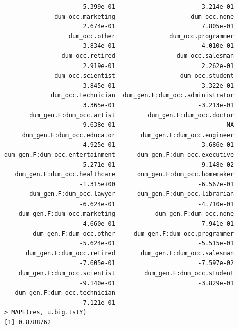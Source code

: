 \documentclass[11pt]{article}
\begin{document}
\begin{verbatim}
                      5.399e-01                        3.214e-01  
              dum_occ.marketing                     dum_occ.none  
                      2.674e-01                        7.805e-01  
                  dum_occ.other               dum_occ.programmer  
                      3.834e-01                        4.010e-01  
                dum_occ.retired                 dum_occ.salesman  
                      2.919e-01                        2.262e-01  
              dum_occ.scientist                  dum_occ.student  
                      3.845e-01                        3.322e-01  
             dum_occ.technician  dum_gen.F:dum_occ.administrator  
                      3.365e-01                       -3.213e-01  
       dum_gen.F:dum_occ.artist         dum_gen.F:dum_occ.doctor  
                     -9.638e-01                               NA  
     dum_gen.F:dum_occ.educator       dum_gen.F:dum_occ.engineer  
                     -4.925e-01                       -3.686e-01  
dum_gen.F:dum_occ.entertainment      dum_gen.F:dum_occ.executive  
                     -5.271e-01                       -9.148e-02  
   dum_gen.F:dum_occ.healthcare      dum_gen.F:dum_occ.homemaker  
                     -1.315e+00                       -6.567e-01  
       dum_gen.F:dum_occ.lawyer      dum_gen.F:dum_occ.librarian  
                     -6.624e-01                       -4.710e-01  
    dum_gen.F:dum_occ.marketing           dum_gen.F:dum_occ.none  
                     -4.660e-01                       -7.941e-01  
        dum_gen.F:dum_occ.other     dum_gen.F:dum_occ.programmer  
                     -5.624e-01                       -5.515e-01  
      dum_gen.F:dum_occ.retired       dum_gen.F:dum_occ.salesman  
                     -7.605e-01                       -7.597e-02  
    dum_gen.F:dum_occ.scientist        dum_gen.F:dum_occ.student  
                     -9.140e-01                       -3.829e-01  
   dum_gen.F:dum_occ.technician  
                     -7.121e-01  
> MAPE(res, u.big.tstY)
[1] 0.8788762
\end{verbatim}
\end{document}
